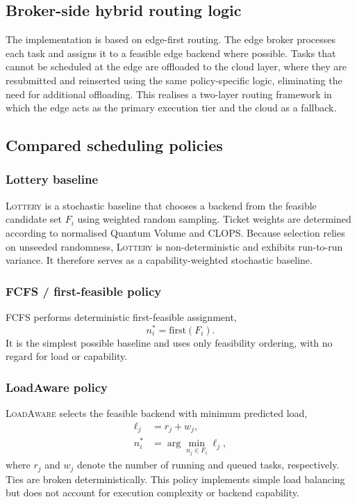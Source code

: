 \documentclass[preprint,12pt]{elsarticle}
\newcommand{\LoadAware}{\textsc{LoadAware}}
\newcommand{\FCFS}{\textsc{FCFS}}
\newcommand{\Lottery}{\textsc{Lottery}}
\begin{document}
\subsection{Broker-side hybrid routing logic}
The implementation is based on edge-first routing. The edge broker processes
each task and assigns it to a feasible edge backend where possible. Tasks that
cannot be scheduled at the edge are offloaded to the cloud layer, where they are
resubmitted and reinserted using the same policy-specific logic, eliminating the
need for additional offloading. This realises a two-layer routing framework in
which the edge acts as the primary execution tier and the cloud as a fallback.

\subsection{Compared scheduling policies}

\subsubsection{Lottery baseline}
\Lottery{} is a stochastic baseline that chooses a backend from the feasible
candidate set $F_i$ using weighted random sampling. Ticket weights are
determined according to normalised Quantum Volume and CLOPS. Because selection
relies on unseeded randomness, \Lottery{} is non-deterministic and exhibits
run-to-run variance. It therefore serves as a capability-weighted stochastic
baseline.

\subsubsection{FCFS / first-feasible policy}
\FCFS{} performs deterministic first-feasible assignment,
\begin{equation}
n_i^{*} = \mathrm{first}(F_i).
\label{eq:fcfs}
\end{equation}
It is the simplest possible baseline and uses only feasibility ordering, with no
regard for load or capability.

\subsubsection{LoadAware policy}
\LoadAware{} selects the feasible backend with minimum predicted load,
\begin{align}
\ell_j &= r_j + w_j, \label{eq:load}\\
n_i^{*} &= \arg\min_{n_j \in F_i} \ell_j , \label{eq:loadaware}
\end{align}
where $r_j$ and $w_j$ denote the number of running and queued tasks,
respectively. Ties are broken deterministically. This policy implements simple
load balancing but does not account for execution complexity or backend
capability.
\end{document}
